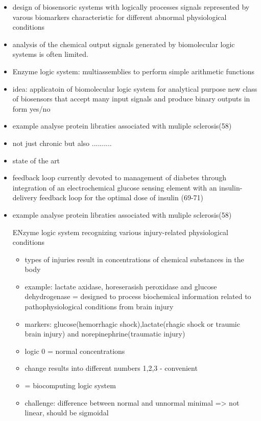 \documentclass[runningheads]{llncs}
\begin{document}
	
	
	\begin{itemize}
		\item design of biosensoric systems with logically processes signals represented by varous biomarkers characteristic for different abnormal physiological conditions
		\item analysis of the chemical output signals generated by biomolecular logic systems is often limited.
		\item Enzyme logic system: multiassemblies to perform simple arithmetic functions
		\item idea: applicatoin of biomolecular logic system for analytical purpose new class of biosensors that accept many input signals and produce binary outputs in form yes/no 
		\item example analyse protein libraties associated with muliple sclerosis(58)
	\end{itemize}

	\begin{itemize}
		\item not just chronic but also ..........
		\item state of the art
		\item feedback loop currently devoted to management of diabetes through integration of an electrochemical glucose sensing element with an insulin-delivery feedback loop for the optimal dose of insulin (69-71)
		\item example analyse protein libraties associated with muliple sclerosis(58)
		
		ENzyme logic system recognizing various injury-related physiological conditions
		\begin{itemize}
			\item types of injuries result in concentrations of chemical substances in the body
			
			\item example: lactate axidase, horeserasish peroxidase and glucose dehydrogenase = designed to process biochemical information related to pathophysiological conditions from brain injury
			\item markers: glucose(hemorrhagic shock),lactate(rhagic shock or traumic brain injury) and norepinephrine(traumatic injury)
			\item logic 0 = normal concentrations
			\item change results into different numbers 1,2,3 - convenient
			\item = biocomputing logic system 
			\item challenge: difference between normal and unnormal minimal => not linear, should be sigmoidal	
		\end{itemize}
	\end{itemize}
\end{document}
